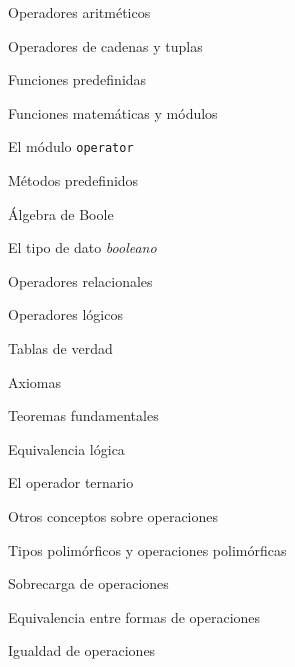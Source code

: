 \begin{longenum}
\begin{longenum}
\begin{longenum}
            \begin{longenum}
                \item Operadores aritméticos
                \item Operadores de cadenas y tuplas
            \end{longenum}
            \item Funciones predefinidas
            \begin{longenum}
                \item Funciones matemáticas y módulos
                \begin{longenum}
                    \item El módulo \texttt{operator}
                \end{longenum}
            \end{longenum}
            \item Métodos predefinidos
        \end{longenum}
        \item Álgebra de Boole
        \begin{longenum}
            \item El tipo de dato \textit{booleano}
            \item Operadores relacionales
            \item Operadores lógicos
            \begin{longenum}
                \item Tablas de verdad
            \end{longenum}
            \item Axiomas
            \item Teoremas fundamentales
            \item Equivalencia lógica
            \item El operador ternario
        \end{longenum}
        \item Otros conceptos sobre operaciones
        \begin{longenum}
            \item Tipos polimórficos y operaciones polimórficas
            \item Sobrecarga de operaciones
            \item Equivalencia entre formas de operaciones
            \item Igualdad de operaciones
        \end{longenum}
    \end{longenum}

\end{longenum}
